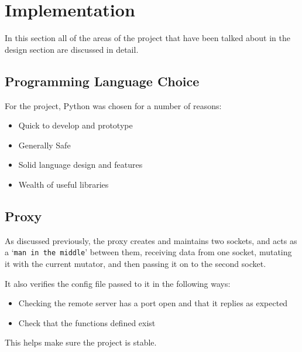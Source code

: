 
\section{Implementation}
In this section all of the areas of the project that have been talked about in the design section are discussed in detail.

\subsection{Programming Language Choice}
For the project, Python was chosen for a number of reasons:
\begin{itemize}
    \item Quick to develop and prototype
    \item Generally Safe
    \item Solid language design and features
    \item Wealth of useful libraries
\end{itemize}

\subsection{Proxy}
As discussed previously, the proxy creates and maintains two sockets, and acts as a `\texttt{man in the middle}' between them, receiving data from one socket, mutating it with the current mutator, and then passing it on to the second socket.\par

It also verifies the config file passed to it in the following ways:
\begin{itemize}
    \item Checking the remote server has a port open and that it replies as expected
    \item Check that the functions defined exist
\end{itemize}
This helps make sure the project is stable.\par

